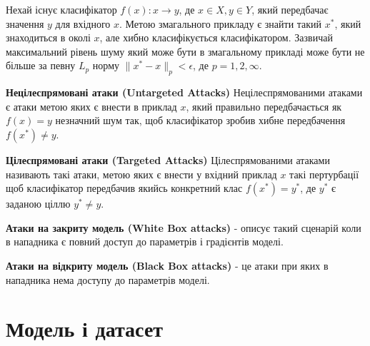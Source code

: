 \documentclass[a4paper,14pt]{extreport}
\begin{document}
	Нехай існує класифікатор $f(x):x\rightarrow y$, де  $x \in X, y \in Y$, який передбачає значення $y$ для вхідного $x$. Метою змагального прикладу є знайти такий $x^{*}$, який знаходиться в околі $x$, але хибно класифікується класифікатором. Зазвичай максимальний рівень шуму який може бути в змагальному прикладі може бути не більше за певну $L_p$ норму $ \| x^{*} - x \|_p < \epsilon $, де $p=1,2,\infty $.
	\newline \par
	\textbf{Нецілеспрямовані атаки (Untargeted Attacks)} \newline Нецілеспрямованими атаками є атаки метою яких є внести в приклад $x$, який правильно передбачається як $f(x) = y$ незначний шум так, щоб класифікатор зробив хибне передбачення $f(x^{*}) \neq y$.
	\newline \par
	\textbf{Цілеспрямовані атаки (Targeted Attacks)} \newline
	Цілеспрямованими атаками називають такі атаки, метою яких є внести у вхідний приклад $x$ такі пертурбації щоб класифікатор передбачив якийсь конкретний клас $f(x^{*}) = y^{*}$, де $y^{*}$ є заданою ціллю $y^{*} \neq y$.
	\newline \par
	\textbf{Атаки на закриту модель (White Box attacks)} - описує такий сценарій коли в нападника є повний доступ до параметрів і градієнтів моделі.  
	\newline \par
	\textbf{Атаки на відкриту модель (Black Box attacks)} - це атаки при яких в нападника нема доступу до параметрів моделі. 

	\chapter{Модель і датасет}
	
\end{document}
